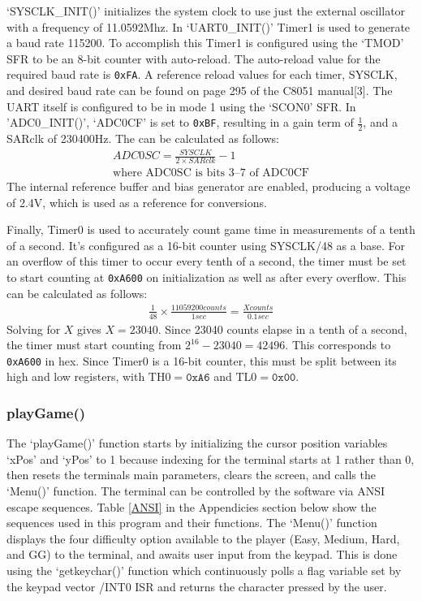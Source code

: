 \documentclass[12pt]{article}
\begin{document}
`SYSCLK\_INIT()' initializes the system clock to use just the external oscillator with a frequency of 11.0592\si{Mhz}. In `UART0\_INIT()' Timer1 is used to generate a baud rate 115200. To accomplish this Timer1 is configured using the `TMOD' SFR to be an 8-bit counter with auto-reload. The auto-reload value for the required baud rate is \texttt{0xFA}. A reference reload values for each timer, SYSCLK, and desired baud rate can be found on page 295 of the C8051 manual[3]. The UART itself is configured to be in mode 1 using the `SCON0' SFR. In 'ADC0\_INIT()', `ADC0CF' is set to \texttt{0xBF}, resulting in a gain term of $\frac{1}{2}$, and a SARclk of 230400\si{Hz}. The can be calculated as follows: 
\begin{gather*}
ADC0SC=\frac{SYSCLK}{2\times SARclk}-1\\
\textrm{where ADC0SC is bits 3--7 of ADC0CF}
\end{gather*}
The internal reference buffer and bias generator are enabled, producing a voltage of 2.4\si{V}, which is used as a reference for conversions. 

Finally, Timer0 is used to accurately count game time in measurements of a tenth of a second. It's configured as a 16-bit counter using SYSCLK/48 as a base. For an overflow of this timer to occur every tenth of a second, the timer must be set to start counting at \texttt{0xA600} on initialization as well as after every overflow. This can be calculated as follows:
\begin{gather*}
\frac{1}{48}\times \frac{11059200 \si{counts}}{\si{1}{sec}}=\frac{X\si{counts}}{0.1\si{sec}}
\end{gather*}
Solving for $X$ gives $X=23040$. Since 23040 counts elapse in a tenth of a second, the timer must start counting from $2^{16}-23040=42496$. This corresponds to \texttt{0xA600} in hex. Since Timer0 is a 16-bit counter, this must be split between its high and low registers, with $\mathrm{TH0}=\texttt{0xA6}$ and $\mathrm{TL0}=\texttt{0x00}$.

\subsubsection{playGame()}
The `playGame()' function starts by initializing the cursor position variables `xPos' and `yPos' to 1 because indexing for the terminal starts at 1 rather than 0, then resets the terminals main parameters, clears the screen, and calls the `Menu()' function. The terminal can be controlled by the software via ANSI escape sequences. Table \ref{ANSI} in the Appendicies section below show the sequences used in this program and their functions. The `Menu()' function displays the four difficulty option available to the player (Easy, Medium, Hard, and GG) to the terminal, and awaits user input from the keypad. This is done using the `getkeychar()' function which continuously polls a flag variable set by the keypad vector /INT0 ISR and returns the character pressed by the user.
\end{document}
